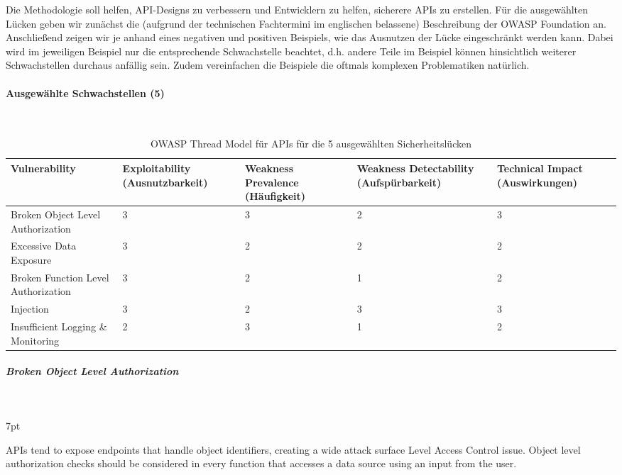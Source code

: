 \documentclass[notitlepage, hidelinks]{article}
\newenvironment{formal}{%
  \def\FrameCommand{%
    \hspace{1pt}%
    {\color{black}\vrule width 2pt}%
    {\color{formalshade}\vrule width 4pt}%
    \colorbox{formalshade}%
  }%
  \MakeFramed{\advance\hsize-\width\FrameRestore}%
  \noindent\hspace{-4.55pt}%
  \begin{adjustwidth}{}{7pt}%
  \vspace{2pt}\vspace{2pt}%
}
{%
  \vspace{2pt}\end{adjustwidth}\endMakeFramed%
}
\begin{document}
Die Methodologie soll helfen, API-Designs zu verbessern und Entwicklern zu helfen, sicherere APIs zu erstellen. Für die ausgewählten Lücken geben wir zunächst die (aufgrund der technischen Fachtermini im englischen belassene) Beschreibung der OWASP Foundation an. Anschließend zeigen wir je anhand eines negativen und positiven Beispiels, wie das Ausnutzen der Lücke eingeschränkt werden kann. Dabei wird im jeweiligen Beispiel nur die entsprechende Schwachstelle beachtet, d.h. andere Teile im Beispiel können hinsichtlich weiterer Schwachstellen durchaus anfällig sein. Zudem vereinfachen die Beispiele die oftmals komplexen Problematiken natürlich.


\paragraph{Ausgewählte Schwachstellen (5)} \mbox{} \\
\begin{table}[H]
\begin{center}
\begin{tabular}{| L{2.3cm} | L{2.3cm} | L{2.3cm} | L{2.3cm} | L{2.3cm} |}
\hline
Vulnerability & Exploitability (Ausnutzbarkeit) & Weakness Prevalence (Häufigkeit) & Weakness Detectability (Aufspürbarkeit) & Technical Impact (Auswirkungen) \\ \hline
Broken Object Level Authorization & 3 & 3 & 2 & 3 \\ \hline
Excessive Data Exposure & 3 & 2 & 2 & 2 \\ \hline
Broken Function Level Authorization & 3 & 2 & 1 & 2 \\ \hline
Injection & 3 & 2 & 3 & 3 \\ \hline
Insufficient Logging \& Monitoring & 2 & 3 & 1 & 2 \\ \hline
\end{tabular}
\caption{OWASP Thread Model für APIs für die 5 ausgewählten Sicherheitslücken}
\label{threadmodel}
\end{center}
\end{table}

\subparagraph{Broken Object Level Authorization} \mbox{} \\

\begin{formal}
APIs tend to expose endpoints that handle object identifiers, creating a wide attack surface Level Access Control issue. Object level authorization checks should be considered in every function that accesses a data source using an input from the user.
\end{formal}
\end{document}
